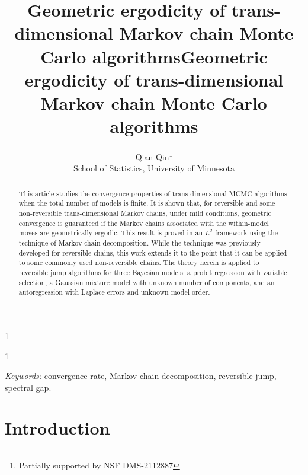 \documentclass[12pt]{article}
\newcommand{\blind}{1}
\begin{document}
%

\def\spacingset#1{\renewcommand{\baselinestretch}%
{#1}\small\normalsize} \spacingset{1}



\blind
{
  \title{\bf Geometric ergodicity of trans-dimensional Markov chain Monte Carlo algorithms}
  \author{}
  \maketitle
} \fi

\blind
{
  \title{\bf Geometric ergodicity of trans-dimensional Markov chain Monte Carlo algorithms}
  \author{Qian Qin\thanks{
  		Partially supported by NSF DMS-2112887}\hspace{.2cm}\\
  	School of Statistics, University of Minnesota}
  \maketitle
} \fi

\bigskip
\begin{abstract}
This article studies the convergence properties of trans-dimensional MCMC algorithms when the total number of models is finite.
It is shown that, for reversible and some non-reversible trans-dimensional Markov chains, under mild conditions, geometric convergence is guaranteed if the Markov chains associated with the within-model moves are geometrically ergodic.
This result is proved in an $L^2$ framework using the technique of Markov chain decomposition.
While the technique was previously developed for reversible chains, this work extends it to the point that it can be applied to some commonly used non-reversible chains.
The theory herein is applied to reversible jump algorithms for three Bayesian models: a probit regression with variable selection, a Gaussian mixture model with unknown number of components, and an autoregression with Laplace errors and unknown model order.
\end{abstract}

\noindent%
{\it Keywords:}  convergence rate, Markov chain decomposition, reversible jump, spectral gap.
\vfill

\newpage
\spacingset{1.9} %

	\section{Introduction} \label{sec:intro}
\end{document}
